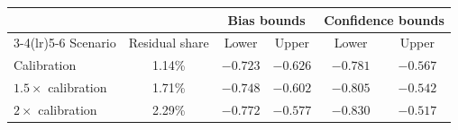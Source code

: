 \begin{tabular}{lccccc}
\toprule
 & & \multicolumn{2}{c}{Bias bounds} & \multicolumn{2}{c}{Confidence bounds}\\
\cmidrule(lr){3-4}\cmidrule(lr){5-6}
Scenario & Residual share & Lower & Upper & Lower & Upper\\
\midrule
Calibration & 1.14\% & $-0.723$ & $-0.626$ & $-0.781$ & $-0.567$\\
$1.5\times$ calibration & 1.71\% & $-0.748$ & $-0.602$ & $-0.805$ & $-0.542$\\
$2\times$ calibration & 2.29\% & $-0.772$ & $-0.577$ & $-0.830$ & $-0.517$\\
\bottomrule
\end{tabular}
